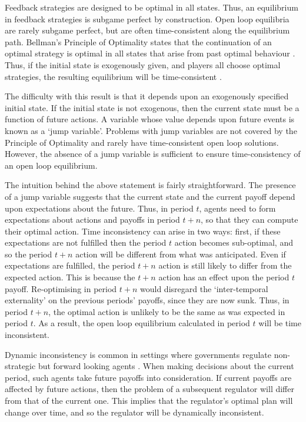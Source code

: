 \label{sec:suff-cond-time} Feedback strategies are designed to be optimal in
all states. Thus, an equilibrium in feedback strategies is subgame perfect
by construction. Open loop equilibria are rarely subgame perfect, but are
often time-consistent along the equilibrium path. Bellman's Principle of
Optimality states that the continuation of an optimal strategy is optimal in
all states that arise from past optimal behaviour \citep{Bellman1957}. Thus,
if the initial state is exogenously given, and players all choose optimal
strategies, the resulting equilibrium will be time-consistent %
\citep{Karp1993a}.

The difficulty with this result is that it depends upon an exogenously
specified initial state. If the initial state is not exogenous, then the
current state must be a function of future actions. A variable whose value
depends upon future events is known as a `jump variable'. Problems with jump
variables are not covered by the Principle of Optimality and rarely have
time-consistent open loop solutions. However, the absence of a jump variable
is sufficient to ensure time-consistency of an open loop equilibrium.

The intuition behind the above statement is fairly straightforward. The
presence of a jump variable suggests that the current state and the current
payoff depend upon expectations about the future. Thus, in period $t$,
agents need to form expectations about actions and payoffs in period $t+n$,
so that they can compute their optimal action. Time inconsistency can arise
in two ways: first, if these expectations are not fulfilled then the period $%
t$ action becomes sub-optimal, and so the period $t+n$ action will be
different from what was anticipated. Even if expectations are fulfilled, the
period $t+n$ action is still likely to differ from the expected action. This
is because the $t+n$ action has an effect upon the period $t$ payoff.
Re-optimising in period $t+n$ would disregard the `inter-temporal
externality' on the previous periods' payoffs, since they are now sunk.
Thus, in period $t+n$, the optimal action is unlikely to be the same as was
expected in period $t$. As a result, the open loop equilibrium calculated in
period $t$ will be time inconsistent.

Dynamic inconsistency is common in settings where governments regulate
non-strategic but forward looking agents \citep{Chari1988}. When making
decisions about the current period, such agents take future payoffs into
consideration. If current payoffs are affected by future actions, then the
problem of a subsequent regulator will differ from that of the current one.
This implies that the regulator's optimal plan will change over time, and so
the regulator will be dynamically inconsistent.

